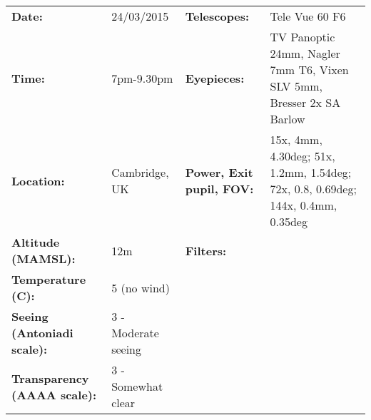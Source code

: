 \begin{tabular}{ p{1.7in} p{1.2in} p{1.5in} p{4.2in}}
{\bf Date:} & 24/03/2015 & {\bf Telescopes:} & Tele Vue 60 F6 \\ 
{\bf Time:} & 7pm-9.30pm & {\bf Eyepieces:} & TV Panoptic 24mm, Nagler 7mm T6, Vixen SLV 5mm, Bresser 2x SA Barlow \\ 
{\bf Location:} & Cambridge, UK & {\bf Power, Exit pupil, FOV:} & 15x, 4mm, 4.30deg; 51x, 1.2mm, 1.54deg; 72x, 0.8, 0.69deg; 144x, 0.4mm, 0.35deg \\ 
{\bf Altitude (MAMSL):} & 12m & {\bf Filters:} &  \\ 
{\bf Temperature (C):} & 5 (no wind) & & \\ 
{\bf Seeing (Antoniadi scale):} & 3 - Moderate seeing & & \\ 
{\bf Transparency (AAAA scale):} & 3 - Somewhat clear & & \\ 
\end{tabular}
\centering 
